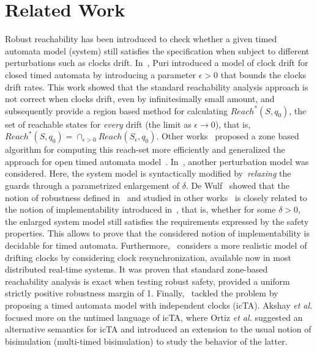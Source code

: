 \section{Related Work}
\label{sec:5}
Robust reachability has been introduced to check whether a given
timed automata model (system) still satisfies the specification when
subject to different perturbations such as clocks drift.
In~\cite{drift:puri98}, Puri introduced a model of clock drift for closed timed automata
by introducing a parameter $\epsilon>0$ that bounds the clocks drift rates.
This work showed that the standard reachability analysis approach is not correct
when clocks drift, even by infinitesimally small amount, and subsequently provide a region based
method for calculating $Reach^*(S,q_0)$, the set of reachable states for \emph{every} drift 
(the limit as $\epsilon\to 0$),
that is, $Reach^*(S,q_0)=\cap_{\epsilon>0} Reach(S_{\epsilon},q_0)$.
Other works~\cite{drift:conrad,drift:puriR} proposed a zone based algorithm for computing
this reach-set more efficiently and generalized the approach for open timed automata 
model~\cite{drift:puriR}.
In~\cite{drift:wulf}, another perturbation model was considered. Here, 
the system model is syntactically modified by~\emph{relaxing} the guards through 
a parametrized  enlargement of $\delta$.
De Wulf~\cite{drift:wulf} showed that the notion of robustness defined in~\cite{drift:puri} and
studied in other works~\cite{drift:conrad, drift:puriR} is closely related to the notion of 
implementability introduced in~\cite{drift:wulf}, that is, whether for some $\delta>0$,
the enlarged system model still satisfies the requirements expressed by the safety properties.
This allows to prove that the considered notion of implementability is decidable 
for timed automata.
Furthermore,~\cite{drift:surp} considers a more realistic model of drifting clocks by considering
clock resynchronization, available now in most distributed real-time systems. It was proven
that standard zone-based reachability analysis  is exact when testing robust safety, provided
a uniform strictly positive robustness margin of 1.
Finally,~\cite{drift:akshay,drift:ortiz} tackled the problem by proposing a timed automata 
model with independent clocks (icTA). Akshay \emph{et al.} focused more on the 
untimed language of icTA, where Ortiz \emph{et al.} suggested an alternative semantics for icTA
and introduced an extension to the usual notion of bisimulation (multi-timed bisimulation) to
study the behavior of the latter. 
